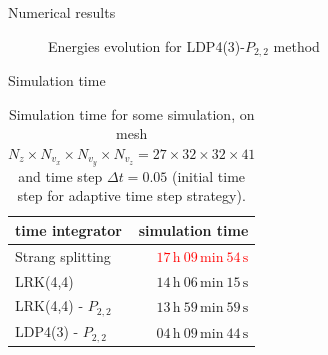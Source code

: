 \documentclass{beamer}
\begin{document}
\begin{frame}{Numerical results}
{\begin{figure}
      \caption{Energies evolution for LDP4(3)-$P_{2,2}$ method}
    \end{figure}
  }
\end{frame}

\begin{frame}{Simulation time}
  \begin{table}[h]
    \centering
    \begin{tabular}{l|r}
      time integrator & simulation time \\
      \hline
      Strang splitting     &    \textcolor{red}{$17\,\text{h}\ 09\,\text{min}\ 54\,\text{s}$} \\
      \hline
      LRK(4,4)             &                    $14\,\text{h}\ 06\,\text{min}\ 15\,\text{s}$ \\
      LRK(4,4) - $P_{2,2}$ &                    $13\,\text{h}\ 59\,\text{min}\ 59\,\text{s}$ \\
      \hline
      LDP4(3) - $P_{2,2}$  & \textcolor{mgreen}{$04\,\text{h}\ 09\,\text{min}\ 44\,\text{s}$} \\
    \end{tabular}
    \caption{Simulation time for some simulation, on mesh $N_z \times N_{v_x} \times N_{v_y} \times N_{v_z}=27\times32\times32\times41$ and time step $\Delta t = 0.05$ (initial time step for adaptive time step strategy).}
  \end{table}
\end{frame}

\end{document}
